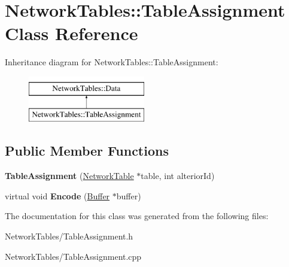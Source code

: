 \hypertarget{classNetworkTables_1_1TableAssignment}{
\section{NetworkTables::TableAssignment Class Reference}
\label{classNetworkTables_1_1TableAssignment}
}
Inheritance diagram for NetworkTables::TableAssignment:\begin{figure}[H]
\begin{center}
\leavevmode
\includegraphics[height=2.000000cm]{classNetworkTables_1_1TableAssignment}
\end{center}
\end{figure}
\subsection*{Public Member Functions}
\begin{DoxyCompactItemize}
\item 
\hypertarget{classNetworkTables_1_1TableAssignment_a1a1fdfdbcaff724f524e1eaaf13a5566}{
{\bfseries TableAssignment} (\hyperlink{classNetworkTable}{NetworkTable} $\ast$table, int alteriorId)}
\label{classNetworkTables_1_1TableAssignment_a1a1fdfdbcaff724f524e1eaaf13a5566}

\item 
\hypertarget{classNetworkTables_1_1TableAssignment_a57434c0b90ca77018d2b2dce8b108ef1}{
virtual void {\bfseries Encode} (\hyperlink{classNetworkTables_1_1Buffer}{Buffer} $\ast$buffer)}
\label{classNetworkTables_1_1TableAssignment_a57434c0b90ca77018d2b2dce8b108ef1}

\end{DoxyCompactItemize}


The documentation for this class was generated from the following files:\begin{DoxyCompactItemize}
\item 
NetworkTables/TableAssignment.h\item 
NetworkTables/TableAssignment.cpp\end{DoxyCompactItemize}
